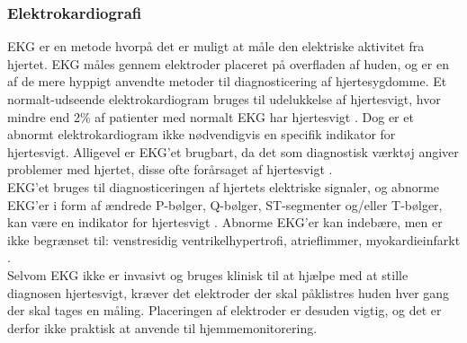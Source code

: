 \subsubsection{Elektrokardiografi}
EKG er en metode hvorpå det er muligt at måle den elektriske aktivitet fra hjertet. EKG måles gennem elektroder placeret på overfladen af huden, og er en af de mere hyppigt anvendte metoder til diagnosticering af hjertesygdomme. Et normalt-udseende elektrokardiogram bruges til udelukkelse af hjertesvigt, hvor mindre end 2\% af patienter med normalt EKG har hjertesvigt \citep{authors2012esc}. Dog er et abnormt elektrokardiogram ikke nødvendigvis en specifik indikator for hjertesvigt. Alligevel er EKG’et brugbart, da det som diagnostisk værktøj angiver problemer med hjertet, disse ofte forårsaget af hjertesvigt \citep{davie1996value} \citep{authors2012esc} \citep{madias2011recording}.\\
EKG’et bruges til diagnosticeringen af hjertets elektriske signaler, og abnorme EKG’er i form af ændrede P-bølger, Q-bølger, ST-segmenter og/eller T-bølger, kan være en indikator for hjertesvigt \citep{madias2011recording}. Abnorme EKG’er kan indebære, men er ikke begrænset til: venstresidig ventrikelhypertrofi, atrieflimmer, myokardieinfarkt \citep{davie1996value}.\\
Selvom EKG ikke er invasivt og bruges klinisk til at hjælpe med at stille diagnosen hjertesvigt, kræver det elektroder der skal påklistres huden hver gang der skal tages en måling. Placeringen af elektroder er desuden vigtig, og det er derfor ikke praktisk at anvende til hjemmemonitorering.

